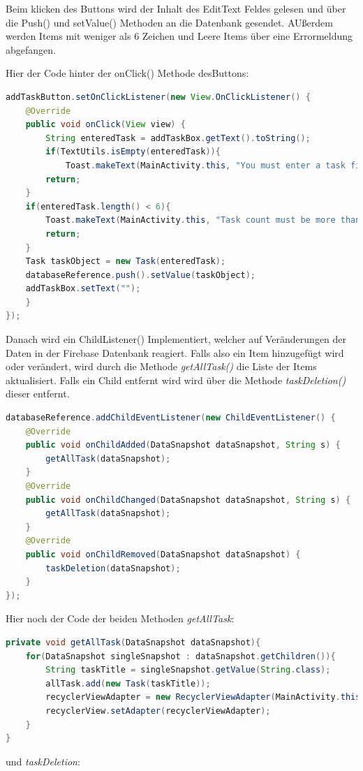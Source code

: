 Beim klicken des Buttons wird der Inhalt des EditText Feldes gelesen und über die Push() und setValue() Methoden an die Datenbank gesendet. AUßerdem werden Items mit weniger als 6 Zeichen und Leere Items über eine Errormeldung abgefangen.

Hier der Code hinter der onClick() Methode desButtons:
\begin{lstlisting}[language=java]
addTaskButton.setOnClickListener(new View.OnClickListener() {
	@Override
	public void onClick(View view) {
		String enteredTask = addTaskBox.getText().toString();
		if(TextUtils.isEmpty(enteredTask)){
			Toast.makeText(MainActivity.this, "You must enter a task first", Toast.LENGTH_LONG).show();
		return;
	}
	if(enteredTask.length() < 6){
		Toast.makeText(MainActivity.this, "Task count must be more than 6", Toast.LENGTH_LONG).show();
		return;
	}
	Task taskObject = new Task(enteredTask);
	databaseReference.push().setValue(taskObject);
	addTaskBox.setText("");
	}
});
\end{lstlisting}

Danach wird ein ChildListener() Implementiert, welcher auf Veränderungen der Daten in der Firebase Datenbank reagiert. Falls also ein Item hinzugefügt wird oder verändert, wird durch die Methode \textit{getAllTask()} die Liste der Items aktualisiert. Falls ein Child entfernt wird wird über die Methode \textit{taskDeletion()} dieser entfernt.

\begin{lstlisting}[language=java]
databaseReference.addChildEventListener(new ChildEventListener() {
	@Override
	public void onChildAdded(DataSnapshot dataSnapshot, String s) {
		getAllTask(dataSnapshot);
	}
	@Override
	public void onChildChanged(DataSnapshot dataSnapshot, String s) {
		getAllTask(dataSnapshot);
	}
	@Override
	public void onChildRemoved(DataSnapshot dataSnapshot) {
		taskDeletion(dataSnapshot);
	}
});
\end{lstlisting}

Hier noch der Code der beiden Methoden \textit{getAllTask}:
\begin{lstlisting}[language=java]
private void getAllTask(DataSnapshot dataSnapshot){
	for(DataSnapshot singleSnapshot : dataSnapshot.getChildren()){
		String taskTitle = singleSnapshot.getValue(String.class);
		allTask.add(new Task(taskTitle));
		recyclerViewAdapter = new RecyclerViewAdapter(MainActivity.this, allTask);
		recyclerView.setAdapter(recyclerViewAdapter);
	}
}
\end{lstlisting}

\clearpage
und \textit{taskDeletion}:

